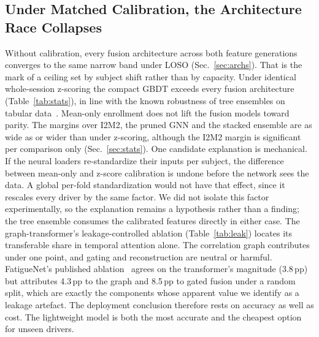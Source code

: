 \documentclass[journal]{IEEEtran}
\newcommand{\pp}{\,pp}
\begin{document}
\subsection{Under Matched Calibration, the Architecture Race Collapses}
Without calibration, every fusion architecture across both feature
generations converges to the same narrow band under LOSO
(Sec.~\ref{sec:archs}). That is the mark of a ceiling set by subject shift
rather than by capacity. Under identical whole-session z-scoring the compact
GBDT exceeds every fusion architecture (Table~\ref{tab:stats}), in line with
the known robustness of tree ensembles on tabular
data~\cite{grinsztajn2022tree,shwartz2022tabular}. Mean-only enrollment does
not lift the fusion models toward parity. The margins over I2M2, the pruned
GNN and the stacked ensemble are as wide as or wider than under z-scoring,
although the I2M2 margin is significant per comparison only
(Sec.~\ref{sec:stats}). One candidate explanation is mechanical. If the neural loaders
re-standardize their inputs per subject, the difference between mean-only and
z-score calibration is undone before the network sees the data. A global
per-fold standardization would not have that effect, since it rescales every
driver by the same factor. We did not isolate this factor experimentally, so
the explanation remains a hypothesis rather than a finding; the tree ensemble
consumes the calibrated features directly in either case. The graph-transformer's
leakage-controlled ablation (Table~\ref{tab:leak}) locates its transferable
share in temporal attention alone. The correlation graph contributes under
one point, and gating and reconstruction are neutral or harmful. FatigueNet's
published ablation~\cite{zendehbad2025fatiguenet} agrees on the transformer's
magnitude (3.8\pp) but attributes 4.3\pp{} to the graph and 8.5\pp{} to gated
fusion under a random split, which are exactly the components whose apparent
value we identify as a leakage artefact. The deployment conclusion therefore
rests on accuracy as well as cost. The lightweight model is both the most
accurate and the cheapest option for unseen drivers.
\end{document}
